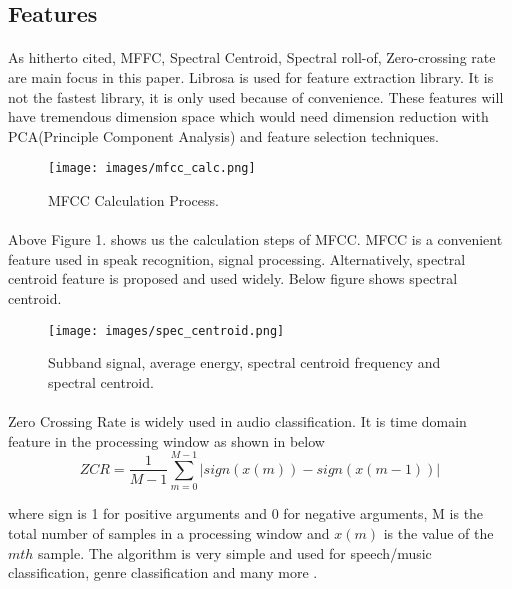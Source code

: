 \documentclass[10pt,twocolumn,letterpaper]{article}
\begin{document}
  \subsection{Features}
  \paragraph{}As hitherto cited, MFFC, Spectral Centroid, Spectral roll-of, Zero-crossing rate\cite{genre_classification_tp} are main focus in this paper. Librosa\cite{librosa} is used for feature extraction library. It is not the fastest library, it is only used because of convenience. These features will have tremendous dimension space which would need dimension reduction with PCA(Principle Component Analysis) and feature selection techniques. 
  \begin{figure}[t]
    \begin{center}
    \texttt{[image: images/mfcc\_calc.png]}
    \end{center}  
       \caption{MFCC Calculation Process.\cite{mfcc_calc}}
    \label{fig:mffc}
    \label{fig:onecol}
  \end{figure}
  \paragraph{} Above Figure 1. shows us the calculation steps of MFCC\cite{mfcc_calc}. MFCC is a convenient feature used in speak recognition, signal processing. Alternatively, spectral centroid feature is proposed and used widely. Below figure shows spectral centroid.\cite{spec_centroid}
  \begin{figure}[t]
    \begin{center}
    \texttt{[image: images/spec\_centroid.png]}
    \end{center}  
       \caption{Subband signal, average energy, spectral centroid frequency and spectral centroid\cite{spec_centroid}.}
    \label{fig:mffc}
    \label{fig:onecol}
  \end{figure} 
  
  \paragraph{}Zero Crossing Rate is widely used in audio classification. It is time domain feature in the processing window as shown in below
  $$ZCR=\frac{1}{M-1}\sum_{m=0}^{M-1} |sign(x(m)) - sign(x(m-1))|$$
  
  where sign is 1 for positive arguments and 0 for negative arguments, M is the total number of samples in a processing window and $x(m)$ is the value of the $mth$ sample. The algorithm is very simple and used for speech/music classification\cite{speech_music}, genre classification and many more \cite{genre_classification_tp}.
  
\end{document}
